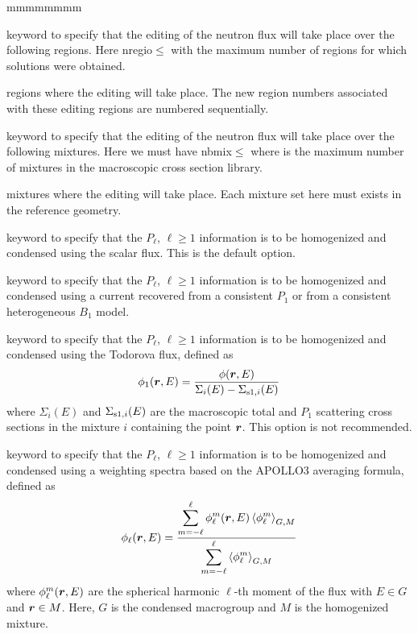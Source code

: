 \begin{ListeDeDescription}{mmmmmmmm}
\item[\moc{REGI}] keyword to specify that the editing of the neutron flux will
take place over the following regions. Here nregio$\le$
with  the maximum number of regions for which solutions were
obtained.

\item[\dusa{iregt}] regions where the editing will take place. The new region
numbers associated with these editing regions are numbered sequentially.

\item[\moc{MIX}] keyword to specify that the editing of the neutron
flux will take place over the following mixtures. Here
we must have nbmix$\le$ where  is the maximum number
of mixtures in the macroscopic cross section library.  

\item[\dusa{imixt}] mixtures where the editing will take place.
Each mixture set here must exists in the reference geometry.

\item[\moc{P0W}] keyword to specify that the $P_\ell$, $\ell\ge 1$ information is to be
homogenized and condensed using the scalar flux. This is the default option.

\item[\moc{P1W\_L}] keyword to specify that the $P_\ell$, $\ell\ge 1$ information is to be
homogenized and condensed using a current recovered from a consistent $P_1$ or
from a consistent heterogeneous $B_1$ model.

\item[\moc{P1W\_TO}] keyword to specify that the $P_\ell$, $\ell\ge 1$ information is to be
homogenized and condensed using the Todorova flux\cite{todorova}, defined as
$$
\phi_1(\bff(r),E)={\phi(\bff(r),E)\over \Sigma_i(E)-\Sigma_{{\rm s1},i}(E)}
$$
\noindent where $\Sigma_i(E)$ and $\Sigma_{{\rm s1},i}(E)$ are the macroscopic total and $P_1$ scattering
cross sections in the mixture $i$ containing the point $\bff(r)$. This option is not recommended.

\item[\moc{PNW\_SP}] keyword to specify that the $P_\ell$, $\ell\ge 1$ information is to be
homogenized and condensed using a weighting spectra based on the APOLLO3 averaging formula\cite{condPn}, defined as
$$
\phi_\ell(\bff(r),E)={ \displaystyle\sum_{m=-\ell}^\ell \phi_\ell^m(\bff(r),E) \left<\phi_\ell^m\right>_{G,M} \over \displaystyle\sum_{m=-\ell}^\ell \left<\phi_\ell^m\right>_{G,M} }
$$
where $\phi_\ell^m(\bff(r),E)$ are the spherical harmonic $\ell$-th moment of the flux with $E \in G$ and $\bff(r) \in M$. Here, $G$ is the
condensed macrogroup and $M$ is the homogenized mixture.


\end{ListeDeDescription}
